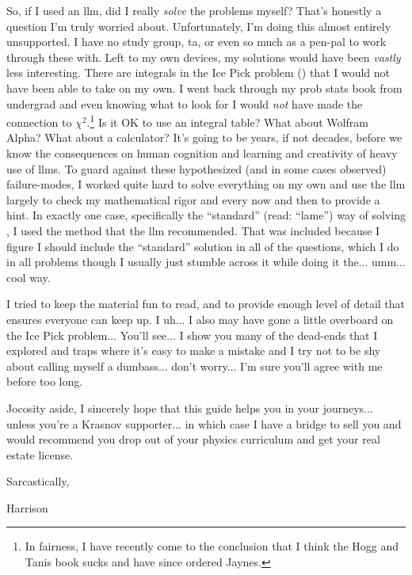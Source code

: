So, if I used an \ac{llm}, did I really \emph{solve} the problems
myself?  That's honestly a question I'm truly worried about.
Unfortunately, I'm doing this almost entirely unsupported.  I have no
study group, \ac{ta}, or even so much as a pen-pal to work through
these with.  Left to my own devices, my solutions would have been
\emph{vastly} less interesting.  There are integrals in the Ice Pick
problem () that I would not have been able
to take on my own.  I went back through my prob stats book from
undergrad and even knowing what to look for I would \emph{not} have
made the connection to $\chi^2$.\footnote{In fairness, I have recently
come to the conclusion that I think the Hogg and Tanis book sucks and
have since ordered Jaynes.}  Is it OK to use an integral table?  What
about Wolfram Alpha?  What about a calculator?  It's going to be
years, if not decades, before we know the consequences on human
cognition and learning and creativity of heavy use of \acp{llm}.  To
guard against these hypothesized (and in some cases observed)
failure-modes, I worked quite hard to solve everything on my own and
use the \ac{llm} largely to check my mathematical rigor and every now
and then to provide a hint.  In exactly one case, specifically the
``standard'' (read: ``lame'') way of solving
, I used the method that the \ac{llm}
recommended.  That was included because I figure I should include the
``standard'' solution in all of the questions, which I do in all
problems though I usually just stumble across it while doing it
the... umm... cool way.

I tried to keep the material fun to read, and to provide enough level
of detail that ensures everyone can keep up.  I uh... I also may have
gone a little overboard on the Ice Pick problem...  You'll see...  I
show you many of the dead-ends that I explored and traps where it's
easy to make a mistake and I try not to be shy about calling myself a
dumbass... don't worry... I'm sure you'll agree with me before too
long.

Jocosity aside, I sincerely hope that this guide helps you in your
journeys... unless you're a Krasnov supporter... in which case I have
a bridge to sell you and would recommend you drop out of your physics
curriculum and get your real estate license.

Sarcastically,

Harrison
